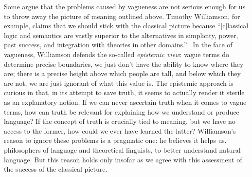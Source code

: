 \documentclass[a4paper]{article}
\begin{document}
Some argue that the problems caused by vagueness are not serious enough for us to throw away the picture of meaning outlined above.
Timothy Williamson, for example, claims that we should stick with the classical picture because ``[c]lassical logic and semantics are vastly superior to the alternatives in simplicity, power, past success, and integration with theories in other domains.''~\parencite*[162]{williamson_vagueness_1992}
In the face of vagueness, Williamson defends the so-called \emph{epistemic view}: vague terms do determine precise boundaries, we just don't have the ability to know where they are; there is a precise height above which people are tall, and below which they are not, we are just ignorant of what this value is.
The epistemic approach is curious in that, in its attempt to save truth, it seems to actually render it sterile as an explanatory notion.
If we can never ascertain truth when it comes to vague terms, how can truth be relevant for explaining how we understand or produce language?
If the concept of truth is crucially tied to meaning, but we have no access to the former, how could we ever have learned the latter?
Williamson's reason to ignore these problems is a pragmatic one: he believes it helps us, philosophers of language and theoretical linguists, to better understand natural language.
But this reason holds only insofar as we agree with this assessment of the success of the classical picture.
\end{document}
